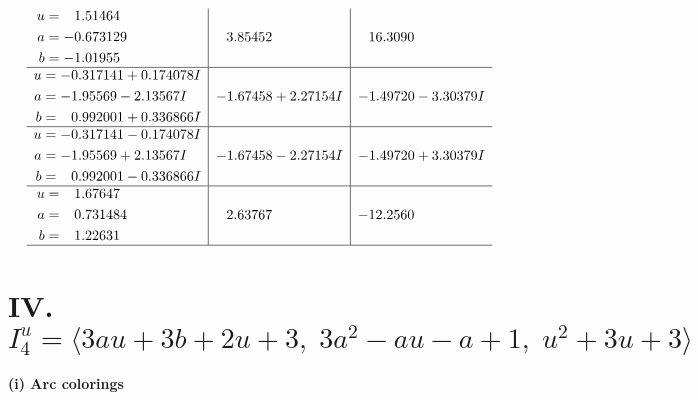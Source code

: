 \documentclass[1p]{elsarticle_modified}
\theoremstyle{definition}
\begin{document}
$$\begin{array}{c|c|c}
\begin{aligned}
u &= \phantom{-}1.51464\phantom{ +0.000000I} \\
a &= -0.673129\phantom{ +0.000000I} \\
b &= -1.01955\phantom{ +0.000000I}\end{aligned}
 & \phantom{-}3.85452\phantom{ +0.000000I} & \phantom{-}16.3090\phantom{ +0.000000I} \\ \hline\begin{aligned}
u &= -0.317141 + 0.174078 I \\
a &= -1.95569 - 2.13567 I \\
b &= \phantom{-}0.992001 + 0.336866 I\end{aligned}
 & -1.67458 + 2.27154 I & -1.49720 - 3.30379 I \\ \hline\begin{aligned}
u &= -0.317141 - 0.174078 I \\
a &= -1.95569 + 2.13567 I \\
b &= \phantom{-}0.992001 - 0.336866 I\end{aligned}
 & -1.67458 - 2.27154 I & -1.49720 + 3.30379 I \\ \hline\begin{aligned}
u &= \phantom{-}1.67647\phantom{ +0.000000I} \\
a &= \phantom{-}0.731484\phantom{ +0.000000I} \\
b &= \phantom{-}1.22631\phantom{ +0.000000I}\end{aligned}
 & \phantom{-}2.63767\phantom{ +0.000000I} & -12.2560\phantom{ +0.000000I}\\
 \hline 
 \end{array}$$\newpage\newpage\renewcommand{\arraystretch}{1}
\centering \section*{IV. $I^u_{4}= \langle 3 a u+3 b+2 u+3,\;3 a^2- a u- a+1,\;u^2+3 u+3 \rangle$}
\flushleft \textbf{(i) Arc colorings}\\
\end{document}
